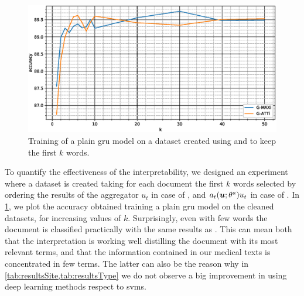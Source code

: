 \begin{figure}
  \centering
  \includegraphics[width=\floatwidth]{img/plotSintex.eps}
  \caption{Training of a plain \ac{gru} model on a dataset created
    using \maxi{} and \softmaxi{} to keep the first $k$ words.}
  \label{fig:sintex}
\end{figure}
To quantify the effectiveness of the interpretability, we designed an
experiment where a dataset is created taking for each document the
first $k$ words selected by  
ordering the results of the aggregator $u_t$ in case of \maxi{}, and
$a_t(\bm{u};\theta^a)u_t$ in case of \softmaxi{}. In
\cref{fig:sintex}, 
we plot the accuracy obtained training a plain \ac{gru} model on the
cleaned datasets, for increasing values of $k$. Surprisingly,
even with few words the document is classified practically with
the same results as \gru{}. This can mean both that the
interpretation is working well distilling the document with its most
relevant terms, and that the information contained in our medical
texts is concentrated in few terms. The latter can also be the reason
why in \cref{tab:resultsSite,tab:resultsType} we do not observe a big
improvement in using deep learning methods respect to \acp{svm}.




